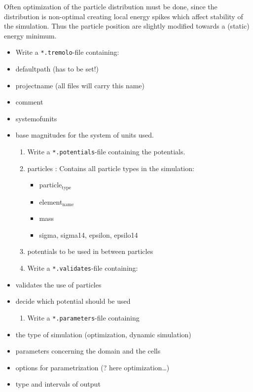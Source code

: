 \documentclass[11pt]{article}
\begin{document}
      Often optimization of the particle distribution must be done, since the distribution is non-optimal creating local energy spikes which affect stability of the simulation. 
      Thus the particle position are slightly modified towards a (static) energy minimum. 

\begin{itemize}
\item Write a \texttt{*.tremolo}-file containing:
\item defaultpath (has to be set!)
\item projectname (all files will carry this name)
\item comment
\item systemofunits
\item base magnitudes for the system of units used.

\begin{enumerate}
\item Write a \texttt{*.potentials}-file containing the potentials.
\item particles : Contains all particle types in the simulation:

\begin{itemize}
\item particle$_{\mathrm{type}}$
\item element$_{\mathrm{name}}$
\item mass
\item sigma, sigma14, epsilon, epsilo14
\end{itemize}

\item potentials to be used in between particles
\item Write a \texttt{*.validates}-file containing:
\end{enumerate}

\item validates the use of particles
\item decide which potential should be used

\begin{enumerate}
\item Write a \texttt{*.parameters}-file containing
\end{enumerate}

\item the type of simulation (optimization, dynamic simulation)
\item parameters concerning the domain and the cells
\item options for parametrization (? here optimization\ldots{})
\item type and intervals of output


\end{itemize}
\end{document}
